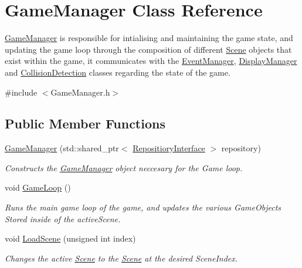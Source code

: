\hypertarget{class_game_manager}{}\section{Game\+Manager Class Reference}
\label{class_game_manager}


\hyperlink{class_game_manager}{Game\+Manager} is responsible for intialising and maintaining the game state, and updating the game loop through the composition of different \hyperlink{class_scene}{Scene} objects that exist within the game, it communicates with the \hyperlink{class_event_manager}{Event\+Manager}, \hyperlink{class_display_manager}{Display\+Manager} and \hyperlink{class_collision_detection}{Collision\+Detection} classes regarding the state of the game.  




{\ttfamily \#include $<$Game\+Manager.\+h$>$}

\subsection*{Public Member Functions}
\begin{DoxyCompactItemize}
\item 
\hyperlink{class_game_manager_a05f6a37de95fcea1313fe4476b95941d}{Game\+Manager} (std\+::shared\+\_\+ptr$<$ \hyperlink{class_repositiory_interface}{Repositiory\+Interface} $>$ repository)
\begin{DoxyCompactList}\small\item\em Constructs the \hyperlink{class_game_manager}{Game\+Manager} object neccesary for the Game loop. \end{DoxyCompactList}\item 
\mbox{\label{class_game_manager_a5baa570812ae717f809fe0dc48bde22e}} 
void \hyperlink{class_game_manager_a5baa570812ae717f809fe0dc48bde22e}{Game\+Loop} ()
\begin{DoxyCompactList}\small\item\em Runs the main game loop of the game, and updates the various Game\+Objects Stored inside of the active\+Scene. \end{DoxyCompactList}\item 
void \hyperlink{class_game_manager_a09b8801bcfdd8d5cbc52e27895b84e3b}{Load\+Scene} (unsigned int index)
\begin{DoxyCompactList}\small\item\em Changes the active \hyperlink{class_scene}{Scene} to the \hyperlink{class_scene}{Scene} at the desired Scene\+Index. \end{DoxyCompactList}\end{DoxyCompactItemize}

